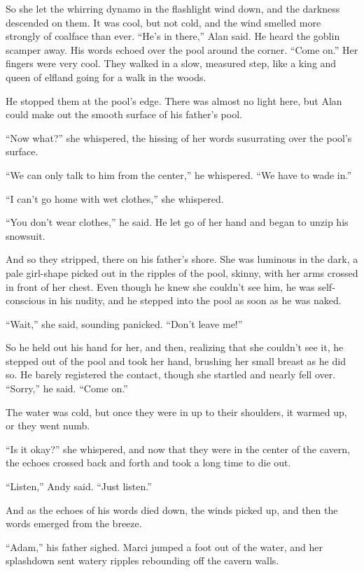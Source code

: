 So she let the whirring dynamo in the flashlight wind down, and the
darkness descended on them.  It was cool, but not cold, and the wind
smelled more strongly of coalface than ever.  ``He's in there,'' Alan
said.  He heard the goblin scamper away.  His words echoed over the
pool around the corner.  ``Come on.'' Her fingers were very cool. 
They walked in a slow, measured step, like a king and queen of elfland
going for a walk in the woods.

He stopped them at the pool's edge.  There was almost no light here,
but Alan could make out the smooth surface of his father's pool.

``Now what?'' she whispered, the hissing of her words susurrating over
the pool's surface.

``We can only talk to him from the center,'' he whispered.  ``We have
to wade in.''

``I can't go home with wet clothes,'' she whispered.

``You don't wear clothes,'' he said.  He let go of her hand and began
to unzip his snowsuit.

And so they stripped, there on his father's shore.  She was luminous
in the dark, a pale girl-shape picked out in the ripples of the pool,
skinny, with her arms crossed in front of her chest.  Even though he
knew she couldn't see him, he was self-conscious in his nudity, and he
stepped into the pool as soon as he was naked.

``Wait,'' she said, sounding panicked.  ``Don't leave me!''

So he held out his hand for her, and then, realizing that she couldn't
see it, he stepped out of the pool and took her hand, brushing her
small breast as he did so.  He barely registered the contact, though
she startled and nearly fell over.  ``Sorry,'' he said.  ``Come on.''

The water was cold, but once they were in up to their shoulders, it
warmed up, or they went numb.

``Is it okay?'' she whispered, and now that they were in the center of
the cavern, the echoes crossed back and forth and took a long time to
die out.

``Listen,'' Andy said.  ``Just listen.''

And as the echoes of his words died down, the winds picked up, and
then the words emerged from the breeze.

``Adam,'' his father sighed.  Marci jumped a foot out of the water,
and her splashdown sent watery ripples rebounding off the cavern
walls.

